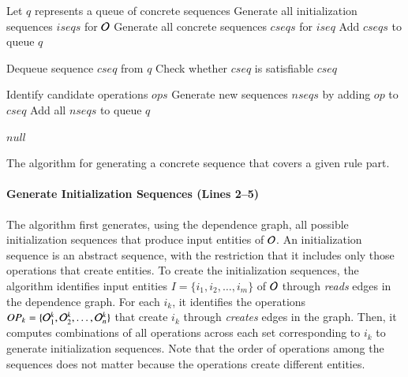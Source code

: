 \begin{algorithm}[t]
\small
\SetAlgoVlined
{}
\BlankLine

\nl Let $q$ represents a queue of concrete sequences\;
\nl Generate all initialization sequences $iseqs$ for ${\cal O}$\;
\nl {}
{
		\nl Generate all concrete sequences $cseqs$ for $iseq$\;
		\nl Add $cseqs$ to queue $q$\;
} 

\nl {}
{
		\nl Dequeue sequence $cseq$ from $q$\;
		\nl Check whether $cseq$ is satisfiable\;
		\nl {}
		{
				\Return $cseq$\;
		}
		
		\nl Identify candidate operations $ops$\;		
		\nl {}
		{
			\nl Generate new sequences $nseqs$ by adding $op$ to $cseq$\;
			\nl Add all $nseqs$ to queue $q$\;
		}
}

\Return $null$\;
		
\caption{\label{alg:guidedsearch} The algorithm for
  generating a concrete sequence that covers a given rule part.}
\end{algorithm}

\paragraph*{Generate Initialization Sequences (Lines 2--5)} The algorithm first
generates, using the dependence graph, all possible initialization sequences
that produce input entities of ${\cal O}$. An initialization sequence is an
abstract sequence, with the restriction that it includes only those operations
that create entities. To create the initialization sequences, the algorithm
identifies input entities $I = \{i_1, i_2, \ldots, i_m\}$ of ${\cal O}$ through
\textit{reads} edges in the dependence graph. For each $i_k$, it identifies the
operations $OP_k = \{{\cal O}^k_1, {\cal O}^k_2, \ldots, {\cal O}^k_n\}$ that
create $i_k$ through \textit{creates} edges in the graph.
Then, it computes combinations of all operations across each set corresponding
to $i_k$ to generate initialization sequences. 
Note that the order of operations among the sequences
does not matter because the operations create different entities.  

